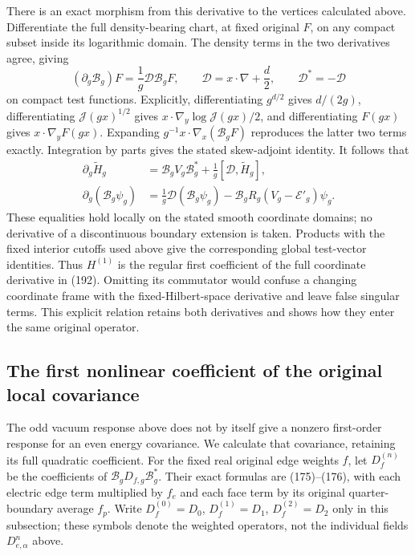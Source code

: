 \documentclass[11pt]{article}
\begin{document}
There is an exact morphism from this derivative to the vertices
calculated above. Differentiate the full density-bearing chart, at
fixed original $F$, on any compact subset inside its logarithmic
domain. The density terms in the two derivatives agree, giving
\begin{equation}\label{eq:vertex-chart-connection}
 (\partial_g\mathcal B_g)F=\frac1g\mathcal D\mathcal B_gF,
 \qquad \mathcal D=x\cdot\nabla+\frac d2,
 \qquad \mathcal D^*=-\mathcal D
\end{equation}
on compact test functions. Explicitly, differentiating $g^{d/2}$
gives $d/(2g)$, differentiating $\mathcal J(gx)^{1/2}$ gives
$x\cdot\nabla_y\log\mathcal J(gx)/2$, and differentiating
$F(gx)$ gives $x\cdot\nabla_yF(gx)$. Expanding
$g^{-1}x\cdot\nabla_x(\mathcal B_gF)$ reproduces the latter two
terms exactly. Integration by parts gives the stated skew-adjoint
identity. It follows that
\begin{align}
 \partial_g\widetilde H_g
   &=\mathcal B_g V_g\mathcal B_g^*
                         +\frac1g[\mathcal D,\widetilde H_g],
       \label{eq:vertex-response-connection}\\
 \partial_g(\mathcal B_g\psi_g)
   &=\frac1g\mathcal D(\mathcal B_g\psi_g)
                 -\mathcal B_gR_g(V_g-\mathcal E'_g)\psi_g.
       \nonumber
\end{align}
These equalities hold locally on the stated smooth coordinate
domains; no derivative of a discontinuous boundary extension is
taken. Products with the fixed interior cutoffs used above give
the corresponding global test-vector identities.
Thus $H^{(1)}$ is the regular first coefficient of the full
coordinate derivative in (192).
Omitting its commutator would confuse a changing coordinate frame
with the fixed-Hilbert-space derivative and leave false singular
terms. This explicit relation retains both derivatives and shows
how they enter the same original operator.

\subsection{The first nonlinear coefficient of the original local covariance}

The odd vacuum response above does not by itself give a nonzero
first-order response for an even energy covariance. We calculate that
covariance, retaining its full quadratic coefficient. For the fixed
real original edge weights $f$, let $D_f^{(n)}$ be the coefficients
of $\mathcal B_gD_{f,g}\mathcal B_g^*$. Their exact formulas are
(175)--(176), with each electric
edge term multiplied by $f_e$ and each face term by its original
quarter-boundary average $f_p$. Write $D_f^{(0)}=D_0$,
$D_f^{(1)}=D_1$, $D_f^{(2)}=D_2$ only in this subsection; these
symbols denote the weighted operators, not the individual fields
$D^n_{e,\alpha}$ above.
\end{document}
